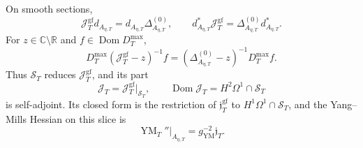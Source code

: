 \begin{proposition}
\label{cusp-native-full-flux-Coulomb-reduction}
On smooth sections,
\begin{equation}
 \mathcal J_T^{\mathrm{gf}}d_{A_{\eta,T}}
 =d_{A_{\eta,T}}\Delta_{A_{\eta,T}}^{(0)},
 \qquad
 d_{A_{\eta,T}}^*\mathcal J_T^{\mathrm{gf}}
 =\Delta_{A_{\eta,T}}^{(0)}d_{A_{\eta,T}}^*.
 \label{cusp-native-full-flux-formal-intertwining}
\end{equation}
For \(z\in\mathbb C\setminus\mathbb R\) and
\(f\in\operatorname{Dom}D_T^{\max}\),
\begin{equation}
 D_T^{\max}(\mathcal J_T^{\mathrm{gf}}-z)^{-1}f
 =(\Delta_{A_{\eta,T}}^{(0)}-z)^{-1}D_T^{\max}f.
 \label{cusp-native-full-flux-resolvent-intertwining}
\end{equation}
Thus \(\mathscr S_T\) reduces \(\mathcal J_T^{\mathrm{gf}}\), and its part
\begin{equation}
 \mathcal J_T=\mathcal J_T^{\mathrm{gf}}\big|_{\mathscr S_T},
 \qquad
 \operatorname{Dom}\mathcal J_T=H^2\Omega^1\cap\mathscr S_T
 \label{cusp-native-full-flux-Coulomb-operator}
\end{equation}
is self-adjoint.  Its closed form is the restriction of
\(\mathfrak j_T^{\mathrm{gf}}\) to \(H^1\Omega^1\cap\mathscr S_T\), and the
Yang--Mills Hessian on this slice is
\begin{equation}
 \operatorname{YM}_T''\big|_{A_{\eta,T}}
 =g_{\mathrm{YM}}^{-2}\mathfrak j_T.
 \label{cusp-native-full-flux-Coulomb-Hessian}
\end{equation}
\end{proposition}

